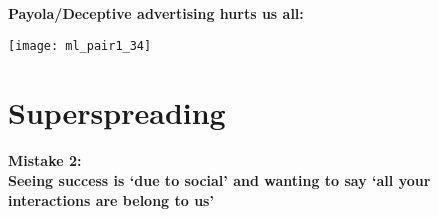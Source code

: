 


  \textbf{Payola/Deceptive advertising hurts us all:}

  \begin{center}
    \texttt{[image: ml\_pair1\_34]}
  \end{center}



\section{Superspreading}


  \textbf{Mistake 2:\\ Seeing success is `due to social' and wanting to say
    `all your interactions are belong to us'}


